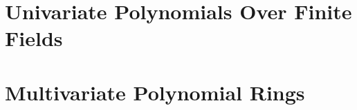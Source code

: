 
\section{Univariate Polynomials Over Finite Fields}
\label{sec:polynomials}





\bigskip




\clearpage

\section{Multivariate Polynomial Rings}
\label{sec:ring:theory:multivariate}




\bigskip



\clearpage


